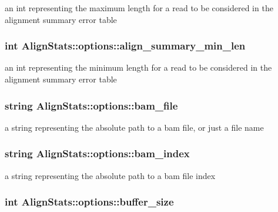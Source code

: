 \label{struct_align_stats_1_1options_a119003c51a782cc237af14b164d529a3}
an int representing the maximum length for a read to be considered in the alignment summary error table \hypertarget{struct_align_stats_1_1options_a4477e10888176b696fbe80caec742fc2}{
\subsubsection[{align\_\-summary\_\-min\_\-len}]{\setlength{\rightskip}{0pt plus 5cm}int {\bf AlignStats::options::align\_\-summary\_\-min\_\-len}}}
\label{struct_align_stats_1_1options_a4477e10888176b696fbe80caec742fc2}
an int representing the minimum length for a read to be considered in the alignment summary error table \hypertarget{struct_align_stats_1_1options_ad85a9162387d560e42421b81b138de99}{
\subsubsection[{bam\_\-file}]{\setlength{\rightskip}{0pt plus 5cm}string {\bf AlignStats::options::bam\_\-file}}}
\label{struct_align_stats_1_1options_ad85a9162387d560e42421b81b138de99}
a string representing the absolute path to a bam file, or just a file name \hypertarget{struct_align_stats_1_1options_ac837b3aaf6b013cd76c8b90916e507f7}{
\subsubsection[{bam\_\-index}]{\setlength{\rightskip}{0pt plus 5cm}string {\bf AlignStats::options::bam\_\-index}}}
\label{struct_align_stats_1_1options_ac837b3aaf6b013cd76c8b90916e507f7}
a string representing the absolute path to a bam file index \hypertarget{struct_align_stats_1_1options_aadebe419d97d862d6441d1563367e246}{
\subsubsection[{buffer\_\-size}]{\setlength{\rightskip}{0pt plus 5cm}int {\bf AlignStats::options::buffer\_\-size}}}
